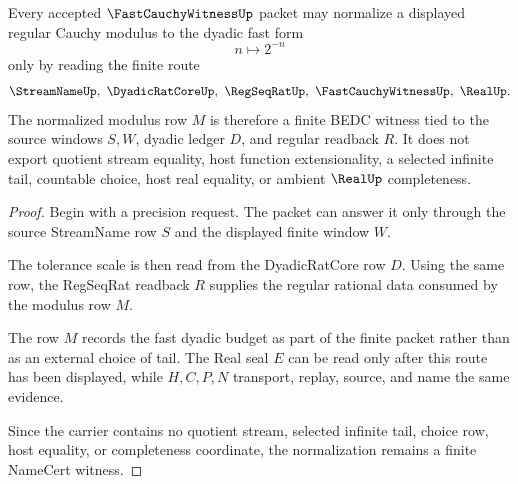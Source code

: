 \begin{theorem}
\label{thm:fast-cauchy-witness-modulus-normalization}
Every accepted $\FastCauchyWitnessUp$ packet may normalize a displayed regular Cauchy modulus to the dyadic fast form
$$
n \longmapsto 2^{-n}
$$
only by reading the finite route
$$
\StreamNameUp,\ \DyadicRatCoreUp,\ \RegSeqRatUp,\ \FastCauchyWitnessUp,\ \RealUp .
$$
The normalized modulus row $M$ is therefore a finite BEDC witness tied to the source windows $S,W$, dyadic ledger $D$, and regular readback $R$. It does not export quotient stream equality, host function extensionality, a selected infinite tail, countable choice, host real equality, or ambient $\RealUp$ completeness.
\end{theorem}
\begin{proof}
Begin with a precision request. The packet can answer it only through the source StreamName row $S$ and the displayed finite window $W$.

The tolerance scale is then read from the DyadicRatCore row $D$. Using the same row, the RegSeqRat readback $R$ supplies the regular rational data consumed by the modulus row $M$.

The row $M$ records the fast dyadic budget as part of the finite packet rather than as an external choice of tail. The Real seal $E$ can be read only after this route has been displayed, while $H,C,P,N$ transport, replay, source, and name the same evidence.

Since the carrier contains no quotient stream, selected infinite tail, choice row, host equality, or completeness coordinate, the normalization remains a finite NameCert witness.
\end{proof}

